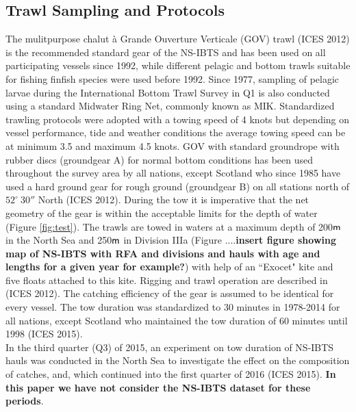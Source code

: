 \documentclass[a4paper 12pt]{article}
\numberwithin{equation}{section}
\newcommand{\m}{\textnormal{\sffamily m}\xspace}
\begin{document}
\subsection{Trawl Sampling and Protocols}
\label{sec:trawlproto}
The mulitpurpose chalut {\`a} Grande Ouverture Verticale (GOV) trawl (ICES 2012) is the recommended standard gear of the NS-IBTS and has been used on all participating vessels since 1992, while different pelagic and bottom trawls suitable for fishing finfish species were used before 1992. Since 1977, sampling of pelagic larvae during the International Bottom Trawl Survey in Q1 is also conducted using a  standard Midwater Ring Net, commonly known as MIK. Standardized trawling protocols were adopted with a towing speed of 4 knots but depending on vessel performance, tide and weather conditions the average towing speed can be at minimum 3.5 and maximum 4.5 knots. GOV with standard groundrope with rubber discs (groundgear A) for normal bottom conditions has been used throughout the survey area by all nations, except Scotland who since 1985 have used a hard ground gear for rough ground (groundgear B) on all stations north of   $52^\circ  \ 30''$ North  (ICES 2012). During the tow it is imperative that the net geometry of the gear is within the acceptable limits for the depth of water (Figure \ref{fig:test}). The trawls are towed in waters at a maximum depth of 200$\m$ in the North Sea and 250$\m$ in Division IIIa (Figure ....{\bf insert figure showing map of NS-IBTS with RFA and divisions and hauls with age and lengths for a given year for example?}) with help of an ``Exocet"  kite and five floats attached to this kite. Rigging and trawl operation are described in (ICES 2012). The catching efficiency of the gear is assumed to be identical for every vessel. The tow duration was standardized to 30 minutes in 1978-2014 for all nations, except Scotland who maintained the tow duration of 60 minutes until 1998 (ICES 2015).  \\
\indent  In the third quarter (Q3) of 2015, an experiment on tow duration of NS-IBTS hauls was conducted in the North Sea to investigate the effect on the composition of catches, and, which continued into the first quarter of 2016 (ICES 2015). {\bf In this paper we have not consider the NS-IBTS dataset for these periods}.\\
\end{document}
